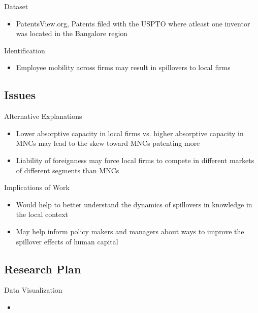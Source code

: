 \documentclass{beamer}
\begin{document}
\begin{frame}{Dataset}{}
\begin{itemize}
\item<1->{PatentsView.org, Patents filed with the USPTO where atleast one inventor was located in the Bangalore region}
\end{itemize}
\end{frame}

\begin{frame}{Identification}{}
\begin{itemize}
\item<1->{Employee mobility across firms may result in spillovers to local firms}
\end{itemize}
\end{frame}

\subsection{Issues}
\begin{frame}{Alternative Explanations}{}
\begin{itemize}
\item<1->{Lower absorptive capacity in local firms vs. higher absorptive capacity in MNCs may lead to the skew toward MNCs patenting more}
\item<2->{Liability of foreignness may force local firms to compete in different markets of different segments than MNCs}
\end{itemize}
\end{frame}

\begin{frame}{Implications of Work}{}
\begin{itemize}
\item<1->{Would help to better understand the dynamics of spillovers in knowledge in the local context}
\item<2->{May help inform policy makers and managers about ways to improve the spillover effects of human capital}
\end{itemize}
\end{frame}

\subsection{Research Plan}
\begin{frame}{Data Visualization}{}
\begin{itemize}
\item<1->{}
\end{itemize}
\end{frame}
\end{document}
